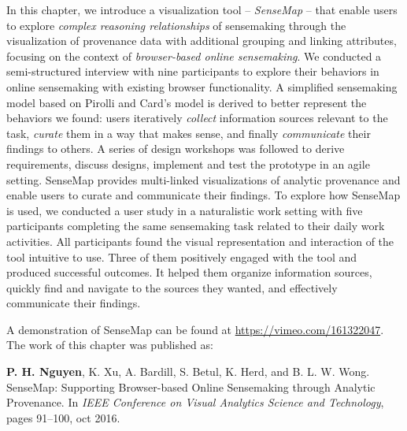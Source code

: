In this chapter, we introduce a visualization tool -- \emph{SenseMap} -- that enable users to explore \emph{complex reasoning relationships} of sensemaking through the visualization of provenance data with additional grouping and linking attributes, focusing on the context of \emph{browser-based online sensemaking}. We conducted a semi-structured interview with nine participants to explore their behaviors in online sensemaking with existing browser functionality. A simplified sensemaking model based on Pirolli and Card's model is derived to better represent the behaviors we found: users iteratively \emph{collect} information sources relevant to the task, \emph{curate} them in a way that makes sense, and finally \emph{communicate} their findings to others. A series of design workshops was followed to derive requirements, discuss designs, implement and test the prototype in an agile setting. SenseMap provides multi-linked visualizations of analytic provenance and enable users to curate and communicate their findings. To explore how SenseMap is used, we conducted a user study in a naturalistic work setting with five participants completing the same sensemaking task related to their daily work activities. All participants found the visual representation and interaction of the tool intuitive to use. Three of them positively engaged with the tool and produced successful outcomes. It helped them organize information sources, quickly find and navigate to the sources they wanted, and effectively communicate their findings.

A demonstration of SenseMap can be found at \url{https://vimeo.com/161322047}. The work of this chapter was published as:

\textbf{P. H. Nguyen}, K. Xu, A. Bardill, S. Betul, K. Herd, and B. L. W. Wong. SenseMap: Supporting Browser-based Online Sensemaking through Analytic Provenance. In \textit{IEEE Conference on Visual Analytics Science and Technology}, pages 91--100, oct 2016.





